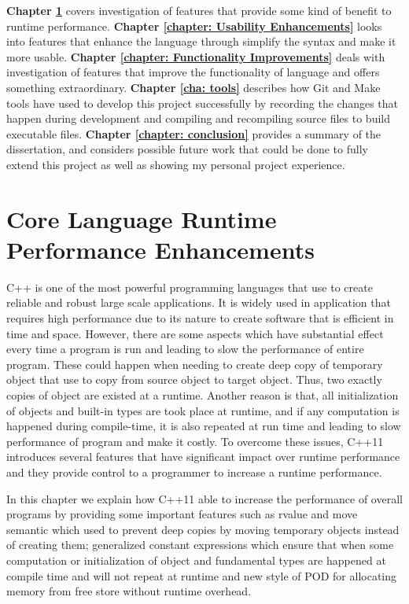 \documentclass[11pt]{report}
\begin{document}
\textbf{Chapter \ref{chapter: Runtime Performance Enhancements}} covers investigation of  features that provide some kind of benefit to runtime performance. \textbf{Chapter \ref{chapter: Usability Enhancements}} looks into features  that  enhance the language through simplify the syntax  and make it more usable. \textbf{Chapter \ref{chapter: Functionality Improvements}} deals with investigation of features that improve the functionality of language and offers something extraordinary. \textbf{Chapter \ref{cha: tools}} describes how Git and Make tools have used to develop this project successfully by recording the changes that happen during development and compiling and recompiling source files to build executable files. \textbf{Chapter \ref{chapter: conclusion}} provides a summary of the dissertation, and considers possible future work that could be done to fully extend this project  as well as showing my personal project experience.


\chapter{Core Language Runtime Performance Enhancements}
\label{chapter: Runtime Performance Enhancements}
C++ is one of the most powerful programming languages that use to create reliable and robust large scale applications. It is widely used in application that requires high performance due to its nature to create software that is efficient in time and space. However, there are some aspects which have substantial effect every time a program is run and leading to slow the performance of entire program.  These could happen when needing to create deep copy of temporary object that use to copy from source object to target object. Thus, two exactly copies of object are existed at a runtime. Another reason is that, all initialization of objects and built-in types are took place at runtime, and if any computation is happened during compile-time, it is also repeated at run time and leading to slow performance of program and make it costly. To overcome these issues, C++11 introduces several features that have significant impact over runtime performance and they provide control to a programmer to increase a runtime performance.

In this chapter we explain how C++11 able to increase the performance of overall programs by providing some important features such as rvalue and move semantic which used to prevent deep copies by moving temporary objects instead of creating them; generalized constant expressions which ensure that when some computation or initialization of object and fundamental types are happened at compile time and will not repeat at runtime and new style of POD for allocating memory from free store without runtime overhead.
\end{document}
